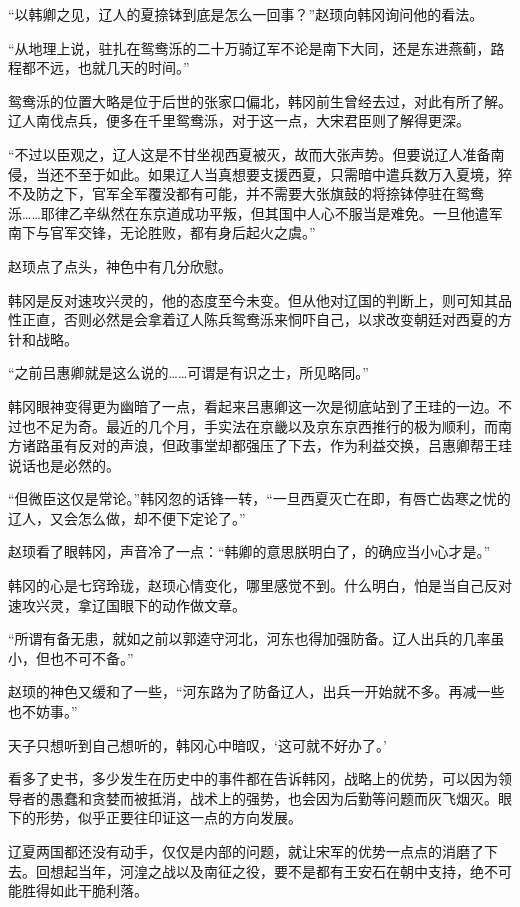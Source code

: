 “以韩卿之见，辽人的夏捺钵到底是怎么一回事？”赵顼向韩冈询问他的看法。

“从地理上说，驻扎在鸳鸯泺的二十万骑辽军不论是南下大同，还是东进燕蓟，路程都不远，也就几天的时间。”

鸳鸯泺的位置大略是位于后世的张家口偏北，韩冈前生曾经去过，对此有所了解。辽人南伐点兵，便多在千里鸳鸯泺，对于这一点，大宋君臣则了解得更深。

“不过以臣观之，辽人这是不甘坐视西夏被灭，故而大张声势。但要说辽人准备南侵，当还不至于如此。如果辽人当真想要支援西夏，只需暗中遣兵数万入夏境，猝不及防之下，官军全军覆没都有可能，并不需要大张旗鼓的将捺钵停驻在鸳鸯泺……耶律乙辛纵然在东京道成功平叛，但其国中人心不服当是难免。一旦他遣军南下与官军交锋，无论胜败，都有身后起火之虞。”

赵顼点了点头，神色中有几分欣慰。

韩冈是反对速攻兴灵的，他的态度至今未变。但从他对辽国的判断上，则可知其品性正直，否则必然是会拿着辽人陈兵鸳鸯泺来恫吓自己，以求改变朝廷对西夏的方针和战略。

“之前吕惠卿就是这么说的……可谓是有识之士，所见略同。”

韩冈眼神变得更为幽暗了一点，看起来吕惠卿这一次是彻底站到了王珪的一边。不过也不足为奇。最近的几个月，手实法在京畿以及京东京西推行的极为顺利，而南方诸路虽有反对的声浪，但政事堂却都强压了下去，作为利益交换，吕惠卿帮王珪说话也是必然的。

“但微臣这仅是常论。”韩冈忽的话锋一转，“一旦西夏灭亡在即，有唇亡齿寒之忧的辽人，又会怎么做，却不便下定论了。”

赵顼看了眼韩冈，声音冷了一点：“韩卿的意思朕明白了，的确应当小心才是。”

韩冈的心是七窍玲珑，赵顼心情变化，哪里感觉不到。什么明白，怕是当自己反对速攻兴灵，拿辽国眼下的动作做文章。

“所谓有备无患，就如之前以郭逵守河北，河东也得加强防备。辽人出兵的几率虽小，但也不可不备。”

赵顼的神色又缓和了一些，“河东路为了防备辽人，出兵一开始就不多。再减一些也不妨事。”

天子只想听到自己想听的，韩冈心中暗叹，‘这可就不好办了。’

看多了史书，多少发生在历史中的事件都在告诉韩冈，战略上的优势，可以因为领导者的愚蠢和贪婪而被抵消，战术上的强势，也会因为后勤等问题而灰飞烟灭。眼下的形势，似乎正要往印证这一点的方向发展。

辽夏两国都还没有动手，仅仅是内部的问题，就让宋军的优势一点点的消磨了下去。回想起当年，河湟之战以及南征之役，要不是都有王安石在朝中支持，绝不可能胜得如此干脆利落。


